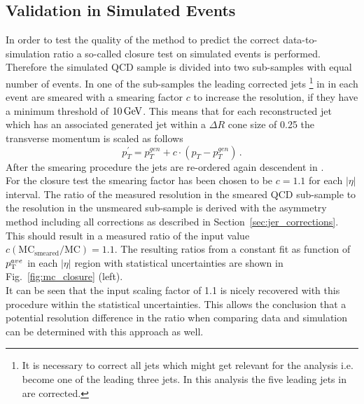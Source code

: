 \subsection{Validation in Simulated Events}
\label{sec:jer_validation_closure}
In order to test the quality of the method to predict the correct data-to-simulation ratio a so-called closure test on simulated events is performed. \\ 
Therefore the simulated QCD sample is divided into two sub-samples with equal number of events. In one of the sub-samples the leading corrected jets \footnote{It is necessary to correct all jets which might get relevant for the analysis i.e. become one of the leading three jets. In this analysis the five leading jets in \pt are corrected.} in \pt in each event are smeared with a smearing factor $c$ to increase the \pt resolution, if they have a minimum \pt threshold of $10\,\rm{GeV}$. This means that for each reconstructed jet which has an associated generated jet within a $\Delta R$ cone size of 0.25 the transverse momentum is scaled as follows
\begin{equation}
 p^{'}_{T} = p^{gen}_{T} + c \cdot (p_{T} - p^{gen}_{T}) \, .
\end{equation} 
After the smearing procedure the jets are re-ordered again descendent in \pt.\\
For the closure test the smearing factor has been chosen to be $c = 1.1$ for each $|\eta|$ interval. The ratio of the measured resolution in the smeared QCD sub-sample to the resolution in the unsmeared sub-sample is derived with the asymmetry method including all corrections as described in Section~\ref{sec:jer_corrections}. This should result in a measured ratio of the input value $c\mathrm{(MC_{smeared}/MC)} = 1.1$. The resulting ratios from a constant fit as function of $p_{\text{T}}^{ave}$ in each $|\eta|$ region with statistical uncertainties are shown in Fig.~\ref{fig:mc_closure} (left).\\
It can be seen that the input scaling factor of 1.1 is nicely recovered with this procedure within the statistical uncertainties. This allows the conclusion that a potential resolution difference in the ratio when comparing data and simulation can be determined with this approach as well.

